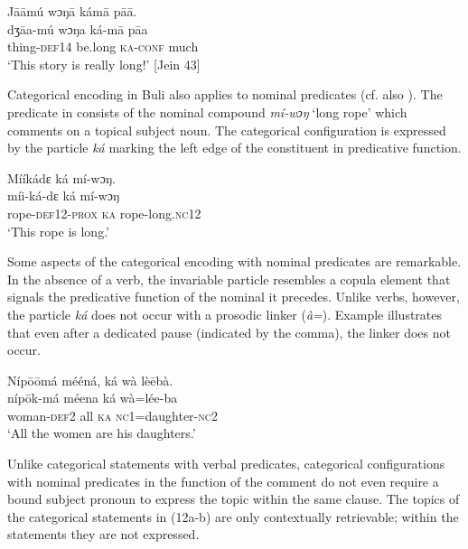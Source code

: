 \documentclass[output=paper]{langsci/langscibook}
\begin{document}
\ea
\glll \textup{}  J\={a}\={a}mú    wɔŋ\={a}    kám\={a}    p\={a}\={a}.\\
  \textup{dʒ\={a}a-mú  wɔŋa    ká-m\={a}    p\={a}a}\\
     thing-\textsc{def}14  be.long  \textsc{ka}{}-\textsc{conf}  much\\
\glt ‘This story is really long!’ [Jein 43]
\z

Categorical encoding in Buli also applies to nominal predicates (cf. also \citealt{Schwarz2009}). The predicate in  consists of the nominal compound \textit{mí-wɔŋ}\textit{}‘long rope’ which comments on a topical subject noun. The categorical configuration is expressed by the particle \textit{ká} marking the left edge of the constituent in predicative function. 

\ea
\glll \textup{  }Mííkádɛ    ká  mí-wɔŋ.\\
  \textup{  míi-ká-dɛ    ká  mí-wɔŋ}\\
       rope-\textsc{def}12-\textsc{prox}  \textsc{ka}  rope-long.\textsc{nc}12\\
\glt ‘This rope is long.’ \citep[267]{Schwarz2009}
\z

Some aspects of the categorical encoding with nominal predicates are remarkable. In the absence of a verb, the invariable particle resembles a copula element that signals the predicative function of the nominal it precedes. Unlike verbs, however, the particle \textit{ká }does not occur with a prosodic linker (\textit{à=}). Example  illustrates that even after a dedicated pause (indicated by the comma), the linker does not occur.

\ea
\glll \textup{}  \textup{Níp\={o}\={o}má  mééná,    ká  wà  lè\={e}bà.}\\
  \textup{  níp\={o}k-má  méena    ká  wà=lée-ba}\\
       woman-\textsc{def}2  all    \textsc{ka}  \textsc{nc}1=daughter-\textsc{nc}2\\
\glt ‘All the women are his daughters.’ \citep[268]{Schwarz2009}
\z

Unlike categorical statements with verbal predicates, categorical configurations with nominal predicates in the function of the comment do not even require a bound subject pronoun to express the topic within the same clause. The topics of the categorical statements in (12a-b) are only contextually retrievable; within the statements they are not expressed.     
\end{document}
